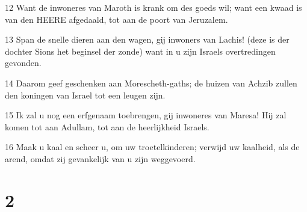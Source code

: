 \par 12 Want de inwoneres van Maroth is krank om des goeds wil; want een kwaad is van den HEERE afgedaald, tot aan de poort van Jeruzalem.
\par 13 Span de snelle dieren aan den wagen, gij inwoners van Lachis! (deze is der dochter Sions het beginsel der zonde) want in u zijn Israels overtredingen gevonden.
\par 14 Daarom geef geschenken aan Morescheth-gaths; de huizen van Achzib zullen den koningen van Israel tot een leugen zijn.
\par 15 Ik zal u nog een erfgenaam toebrengen, gij inwoneres van Maresa! Hij zal komen tot aan Adullam, tot aan de heerlijkheid Israels.
\par 16 Maak u kaal en scheer u, om uw troetelkinderen; verwijd uw kaalheid, als de arend, omdat zij gevankelijk van u zijn weggevoerd.

\chapter{2}

